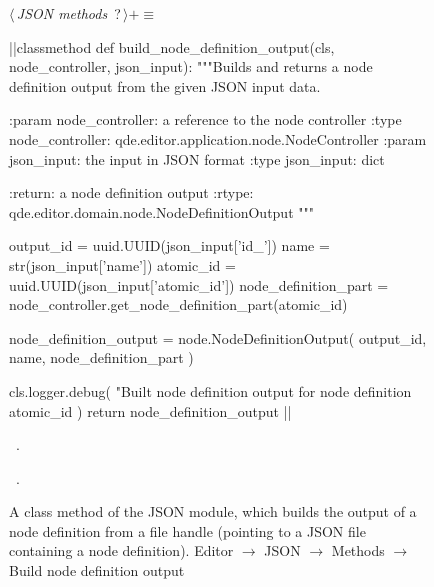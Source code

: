 \documentclass[%
    a4paper,    %
    justified,  %
    nobib,      %
    openany     %
]{tufte-book}
\begin{document}
\begin{figure}
\begin{flushleft} \small
\begin{minipage}{\linewidth}\label{scrap137}\raggedright\small
{} $\langle\,${\itshape JSON methods}\nobreak\ {\footnotesize {?}}$\,\rangle+\equiv$
\vspace{-1ex}
\begin{pythoncode}
|\normalfont{}\fontfamily{}|classmethod
def build_node_definition_output(cls, node_controller, json_input):
    """Builds and returns a node definition output from the given JSON input
    data.

    :param node_controller: a reference to the node controller
    :type  node_controller: qde.editor.application.node.NodeController
    :param json_input: the input in JSON format
    :type  json_input: dict

    :return: a node definition output
    :rtype:  qde.editor.domain.node.NodeDefinitionOutput
    """

    output_id             = uuid.UUID(json_input['id_'])
    name                 = str(json_input['name'])
    atomic_id            = uuid.UUID(json_input['atomic_id'])
    node_definition_part = node_controller.get_node_definition_part(atomic_id)

    node_definition_output = node.NodeDefinitionOutput(
        output_id,
        name,
        node_definition_part
    )

    cls.logger.debug(
        "Built node definition output for node definition %
        atomic_id
    )
    return node_definition_output
|\NWsep|
\end{pythoncode}
\vspace{1.5ex}
\footnotesize
\begin{list}{}{\setlength{\itemsep}{-\parsep}\setlength{\itemindent}{-\leftmargin}}
\item \NWtxtMacroDefBy\ .
\item \NWtxtMacroRefIn\ .

\item{}
\end{list}
\end{minipage}\vspace{4ex}
\end{flushleft}
\caption{A class method of the JSON module, which builds the output of a node
  definition from a file handle (pointing to a JSON file containing a node
  definition).
  \newline{}\newline{}Editor $\rightarrow$ JSON $\rightarrow$
  Methods $\rightarrow$ Build node definition output}
\label{editor:lst:json:methods:build-node-definition-output}
\end{figure}
\end{document}
